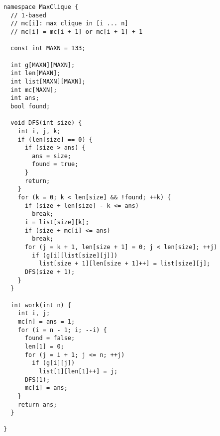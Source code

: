 \begin{lstlisting}
namespace MaxClique {
  // 1-based
  // mc[i]: max clique in [i ... n]
  // mc[i] = mc[i + 1] or mc[i + 1] + 1

  const int MAXN = 133;

  int g[MAXN][MAXN];
  int len[MAXN];
  int list[MAXN][MAXN];
  int mc[MAXN];
  int ans;
  bool found;

  void DFS(int size) {
    int i, j, k;
    if (len[size] == 0) {
      if (size > ans) {
        ans = size;
        found = true;
      }
      return;
    }
    for (k = 0; k < len[size] && !found; ++k) {
      if (size + len[size] - k <= ans)
        break;
      i = list[size][k];
      if (size + mc[i] <= ans)
        break;
      for (j = k + 1, len[size + 1] = 0; j < len[size]; ++j)
        if (g[i][list[size][j]])
          list[size + 1][len[size + 1]++] = list[size][j];
      DFS(size + 1);
    }
  }

  int work(int n) {
    int i, j;
    mc[n] = ans = 1;
    for (i = n - 1; i; --i) {
      found = false;
      len[1] = 0;
      for (j = i + 1; j <= n; ++j)
        if (g[i][j])
          list[1][len[1]++] = j;
      DFS(1);
      mc[i] = ans;
    }
    return ans;
  }

}

\end{lstlisting}